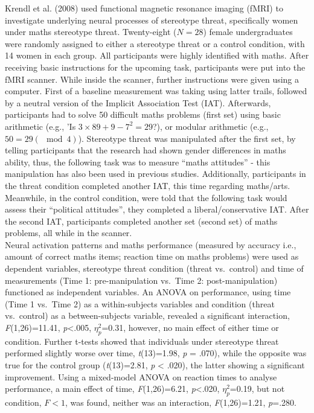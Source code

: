 \documentclass[
  stu]{apa7}
\begin{document}
Krendl et al. (2008) used functional magnetic resonance imaging (fMRI) to investigate underlying neural processes of stereotype threat, specifically women under maths stereotype threat.
Twenty-eight (\(N=28\)) female undergraduates were randomly assigned to either a stereotype threat or a control condition, with 14 women in each group.
All participants were highly identified with maths.
After receiving basic instructions for the upcoming task, participants were put into the fMRI scanner.
While inside the scanner, further instructions were given using a computer.
First of a baseline measurement was taking using latter trails, followed by a neutral version of the Implicit Association Test (IAT).
Afterwards, participants had to solve 50 difficult maths problems (first set) using basic arithmetic (e.g., 'Is \(3 \times 89+9-7^2 = 29\)?), or modular arithmetic (e.g., \(50=29(\mod{4})\)).
Stereotype threat was manipulated after the first set, by telling participants that the research had shown gender differences in maths ability, thus, the following task was to measure ``maths attitudes'' - this manipulation has also been used in previous studies.
Additionally, participants in the threat condition completed another IAT, this time regarding maths/arts.
Meanwhile, in the control condition, were told that the following task would assess their ``political attitudes'', they completed a liberal/conservative IAT.
After the second IAT, participants completed another set (second set) of maths problems, all while in the scanner.\\
Neural activation patterns and maths performance (measured by accuracy i.e., amount of correct maths items; reaction time on maths problems) were used as dependent variables, stereotype threat condition (threat vs.~control) and time of measurements (Time 1: pre-manipulation vs.~Time 2: post-manipulation) functioned as independent variables.
An ANOVA on performance, using time (Time 1 vs.~Time 2) as a within-subjects variables and condition (threat vs.~control) as a between-subjects variable, revealed a significant interaction, \emph{F}(1,26)=11.41, \emph{p}\textless.005, \(\eta^{2}_{p}\)=0.31, however, no main effect of either time or condition.
Further t-tests showed that individuals under stereotype threat performed slightly worse over time, \emph{t}(13)=1.98, \emph{p} = .070), while the opposite was true for the control group (\emph{t}(13)=2.81, \emph{p} \textless{} .020), the latter showing a significant improvement.
Using a mixed-model ANOVA on reaction times to analyse performance, a main effect of time, \emph{F}(1,26)=6.21, \emph{p}\textless.020, \(\eta^{2}_{p}\)=0.19, but not condition, \(F<1\), was found, neither was an interaction, \emph{F}(1,26)=1.21, \emph{p}=.280.
\end{document}
